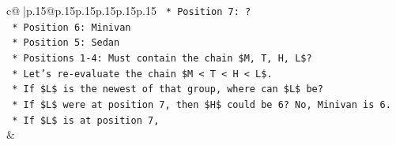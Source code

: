 \documentclass{article}
\begin{document}
{\begin{supertabular}{c@{$\;$}|p{.15\linewidth}@{}p{.15\linewidth}p{.15\linewidth}p{.15\linewidth}p{.15\linewidth}p{.15\linewidth}}
{{{\texttt{    *   Position 7: ?} \\
\texttt{    *   Position 6: Minivan} \\
\texttt{    *   Position 5: Sedan} \\
\texttt{    *   Positions 1{-}4: Must contain the chain \$M, T, H, L\$?} \\
\texttt{    *   Let's re{-}evaluate the chain \$M < T < H < L\$.} \\
\texttt{    *   If \$L\$ is the newest of that group, where can \$L\$ be?} \\
\texttt{    *   If \$L\$ were at position 7, then \$H\$ could be 6? No, Minivan is 6.} \\
\texttt{    *   If \$L\$ is at position 7,} \\
            }
        }
    }
    & \\ \\


\end{supertabular}}
\end{document}
